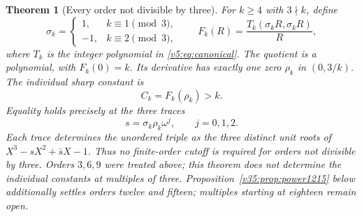 \documentclass[UTF8,11pt]{ctexart}
\newtheorem{thm}{Theorem}[section]
\theoremstyle{definition}
\numberwithin{equation}{section}
\begin{document}
\begin{thm}[Every order not divisible by three]
\label{v34:thm:nonmultiples}
For $k\ge4$ with $3\nmid k$, define
\[
 \sigma_k=\begin{cases}1,&k\equiv1\pmod3,\\-1,&k\equiv2\pmod3,
 \end{cases}
 \qquad F_k(R)=\frac{T_k(\sigma_kR,\sigma_kR)}R,
\]
where $T_k$ is the integer polynomial in
\eqref{v5:eq:canonical}. The quotient is a polynomial, with
$F_k(0)=k$. Its derivative has exactly one zero $\rho_k$ in
$(0,3/k)$. The individual sharp constant is
\begin{equation}\label{v34:eq:constant}
                         C_k=F_k(\rho_k)>k.
\end{equation}
Equality holds precisely at the three traces
\begin{equation}\label{v34:eq:equality}
                         s=\sigma_k\rho_k\omega^j,
                         \qquad j=0,1,2.
\end{equation}
Each trace determines the unordered triple as the three distinct
unit roots of $X^3-sX^2+\bar sX-1$.
Thus no finite-order cutoff is required for orders not divisible
by three. Orders $3,6,9$ were treated above; this theorem does
not determine the individual constants at multiples of three.
Proposition~\ref{v35:prop:power1215} below additionally settles
orders twelve and fifteen; multiples starting at eighteen remain open.
\end{thm}
\end{document}
